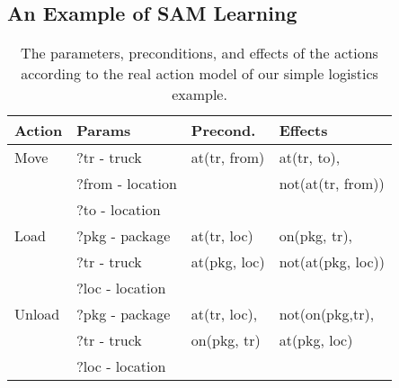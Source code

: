 \documentclass{article}
\newcommand{\pre}{\textit{pre}}
\newcommand{\eff}{\textit{eff}}
\newcommand{\realm}{\ensuremath{M^*}\xspace}
\newcommand{\lifta}{A}
\begin{document}





\subsection{An Example of SAM Learning}

\begin{table}
\small
\begin{tabular}{|l|l|l|l|}
\hline
Action & Params           & Precond.          & Effects               \\\hline
Move   & ?tr - truck      & at(tr, from) & at(tr, to),       \\
       & ?from - location &              & not(at(tr, from)) \\
       & ?to - location   &              &                   \\\hline
Load   & ?pkg - package   & at(tr, loc)  & on(pkg, tr),      \\
       & ?tr - truck      & at(pkg, loc) & not(at(pkg, loc)) \\
       & ?loc - location  &              &                   \\\hline
Unload & ?pkg - package   & at(tr, loc), & not(on(pkg,tr),   \\
       & ?tr - truck      & on(pkg, tr)  & at(pkg, loc)      \\
       & ?loc - location  &              &               \\   \hline
\end{tabular}
\caption{The parameters, preconditions, and effects of the actions according to the real action model of our simple logistics example.}
\label{tab:example-actions}
\end{table}
\end{document}
